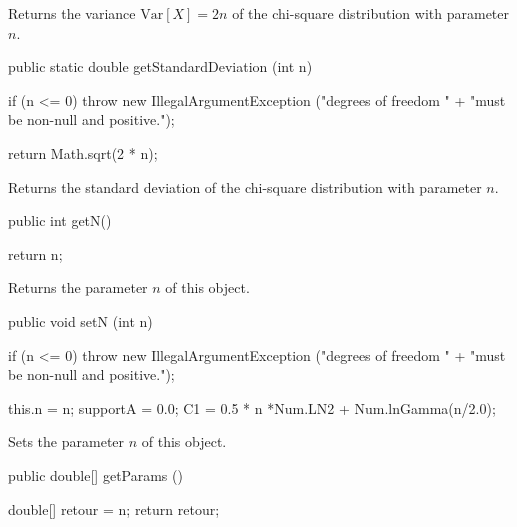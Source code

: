 \begin{tabb}  Returns the variance $\mbox{Var}[X] = 2n$
   of the chi-square distribution with parameter $n$.
\end{tabb}
\begin{htmlonly}
   \return{the variance of the chi-square distribution $\mbox{Var}X] = 2n$}
\end{htmlonly}
\begin{code}

   public static double getStandardDeviation (int n)\begin{hide} {
      if (n <= 0)
         throw new IllegalArgumentException ("degrees of freedom " +
                              "must be non-null and positive.");

      return Math.sqrt(2 * n);
   }\end{hide}
\end{code}
\begin{tabb}  Returns the standard deviation
   of the chi-square distribution with parameter $n$.
\end{tabb}
\begin{htmlonly}
\end{htmlonly}
\begin{code}

   public int getN()\begin{hide} {
      return n;
   }\end{hide}
\end{code}
 \begin{tabb} Returns the parameter $n$ of this object.
 \end{tabb}
\begin{code}

   public void setN (int n)\begin{hide} {
      if (n <= 0)
         throw new IllegalArgumentException ("degrees of freedom " +
                              "must be non-null and positive.");

      this.n = n;
      supportA = 0.0;
      C1 = 0.5 * n *Num.LN2 + Num.lnGamma(n/2.0);
   }\end{hide}
\end{code}
 \begin{tabb} Sets the parameter $n$ of this object.
 \end{tabb}
 \begin{code}

   public double[] getParams ()\begin{hide} {
      double[] retour = {n};
      return retour;
   }\end{hide}
\end{code}

